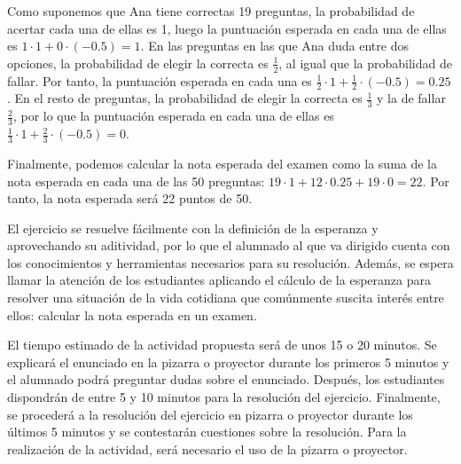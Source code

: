 \documentclass[12pt]{article}
\begin{document}
Como suponemos que Ana tiene correctas 19 preguntas, la probabilidad de acertar cada una de ellas es 1, luego la puntuación esperada en cada una de ellas es $1\cdot1+0\cdot(-0.5)=1$. En las preguntas en las que Ana duda entre dos opciones, la probabilidad de elegir la correcta es $\frac{1}{2}$, al igual que la probabilidad de fallar. Por tanto, la puntuación esperada en cada una es $\frac{1}{2}\cdot 1+\frac{1}{2}\cdot(-0.5)=0.25$. En el resto de preguntas, la probabilidad de elegir la correcta es $\frac{1}{3}$ y la de fallar $\frac{2}{3}$, por lo que la puntuación esperada en cada una de ellas es $\frac{1}{3}\cdot 1+\frac{2}{3}\cdot (-0.5)=0$.

Finalmente, podemos calcular la nota esperada del examen como la suma de la nota esperada en cada una de las 50 preguntas: $19\cdot 1+12\cdot 0.25+19\cdot 0=22$. Por tanto, la nota esperada será 22 puntos de 50.

El ejercicio se resuelve fácilmente con la definición de la esperanza y aprovechando su aditividad, por lo que el alumnado al que va dirigido cuenta con los conocimientos y herramientas necesarios para su resolución. Además, se espera llamar la atención de los estudiantes aplicando el cálculo de la esperanza para resolver una situación de la vida cotidiana que comúnmente suscita interés entre ellos: calcular la nota esperada en un examen.

El tiempo estimado de la actividad propuesta será de unos 15 o 20 minutos. Se explicará el enunciado en la pizarra o proyector durante los primeros 5 minutos y el alumnado podrá preguntar dudas sobre el enunciado. Después, los estudiantes dispondrán de entre 5 y 10 minutos para la resolución del ejercicio. Finalmente, se procederá a la resolución del ejercicio en pizarra o proyector durante los últimos 5 minutos y se contestarán cuestiones sobre la resolución. Para la realización de la actividad, será necesario el uso de la pizarra o proyector.
\end{document}
